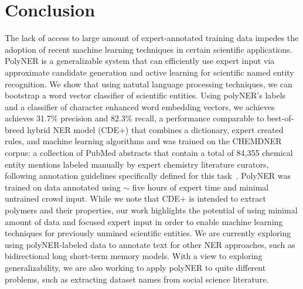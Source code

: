 \section{Conclusion}
\label{sect:apner_conclusion}
The lack of access to large amount of expert-annotated training data impedes the adoption of recent machine learning techniques in certain scientific applications.
PolyNER is a generalizable system that can efficiently use expert input via approximate candidate generation and active learning for scientific named entity recognition.
We show that using natutal language processing techniques, we can bootstrap a word vector classifier of scientific entities.
Using polyNER's labels and a classifier of character enhanced word embedding vectors, we achieves achieves 31.7\% precision and 82.3\% recall,  a performance comparable to best-of-breed
\loganfussingaboutrecallandprecision
hybrid NER model (CDE+) that combines a dictionary, expert created
rules, and machine learning algorithms and was trained on the CHEMDNER corpus:
a collection of  PubMed abstracts that contain a total of 84,355 chemical entity mentions labeled manually by expert chemistry literature curators, following annotation guidelines specifically defined for this task~\cite{krallinger2015chemdner}. 
PolyNER was trained on data annotated using $\sim$ five hours of expert time and minimal untrained crowd input.
While we note that CDE+ is intended to extract polymers and their properties, our work highlights the potential of using minimal amount of data and focused expert input in order to enable machine learning techniques for previously unmined scientific entities. 
We are currently exploring using polyNER-labeled data to annotate text for other NER approaches,
such as bidirectional long short-term memory models.
With a view to exploring generalizability, we are also working to apply polyNER
to quite different problems, such as extracting dataset names from social science
literature. 